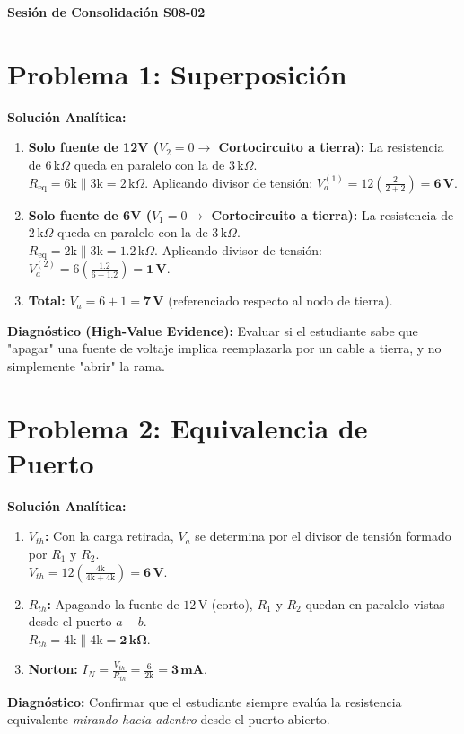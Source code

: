 \documentclass[11pt, a4paper]{article}
\begin{document}
\begin{tcolorbox}[colback=ucbblue!5!white, colframe=ucbblue, title=\textbf{Clave Docente: Solucionario y Rúbrica de Diagnóstico}]
    \centering \textbf{Sesión de Consolidación S08-02}
\end{tcolorbox}

\section*{Problema 1: Superposición}
\textbf{Solución Analítica:}
\begin{enumerate}
    \item \textbf{Solo fuente de 12V ($V_2 = 0 \rightarrow$ Cortocircuito a tierra):} La resistencia de $6\,\text{k}\Omega$ queda en paralelo con la de $3\,\text{k}\Omega$. \\
    $R_{\text{eq}} = 6\text{k} \parallel 3\text{k} = 2\,\text{k}\Omega$. Aplicando divisor de tensión: $V_a^{(1)} = 12 \left( \frac{2}{2 + 2} \right) = \mathbf{6\,\text{V}}$.
    \item \textbf{Solo fuente de 6V ($V_1 = 0 \rightarrow$ Cortocircuito a tierra):} La resistencia de $2\,\text{k}\Omega$ queda en paralelo con la de $3\,\text{k}\Omega$. \\
    $R_{\text{eq}} = 2\text{k} \parallel 3\text{k} = 1.2\,\text{k}\Omega$. Aplicando divisor de tensión: $V_a^{(2)} = 6 \left( \frac{1.2}{6 + 1.2} \right) = \mathbf{1\,\text{V}}$.
    \item \textbf{Total:} $V_a = 6 + 1 = \mathbf{7\,\text{V}}$ (referenciado respecto al nodo de tierra).
\end{enumerate}
\textbf{Diagnóstico (High-Value Evidence):} Evaluar si el estudiante sabe que "apagar" una fuente de voltaje implica reemplazarla por un cable a tierra, y no simplemente "abrir" la rama.

\section*{Problema 2: Equivalencia de Puerto}
\textbf{Solución Analítica:}
\begin{enumerate}
    \item \textbf{$V_{th}$:} Con la carga retirada, $V_a$ se determina por el divisor de tensión formado por $R_1$ y $R_2$. \\
    $V_{th} = 12 \left( \frac{4\text{k}}{4\text{k} + 4\text{k}} \right) = \mathbf{6\,\text{V}}$.
    \item \textbf{$R_{th}$:} Apagando la fuente de $12\,\text{V}$ (corto), $R_1$ y $R_2$ quedan en paralelo vistas desde el puerto $a-b$. \\
    $R_{th} = 4\text{k} \parallel 4\text{k} = \mathbf{2\,\text{k}\Omega}$.
    \item \textbf{Norton:} $I_N = \frac{V_{th}}{R_{th}} = \frac{6}{2\text{k}} = \mathbf{3\,\text{mA}}$.
\end{enumerate}
\textbf{Diagnóstico:} Confirmar que el estudiante siempre evalúa la resistencia equivalente \textit{mirando hacia adentro} desde el puerto abierto.
\end{document}
